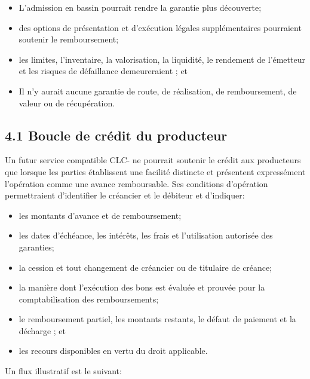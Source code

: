 \documentclass[11pt]{article}
\begin{document}
\begin{itemize}[leftmargin=*]
\item L'admission en bassin pourrait rendre la garantie plus découverte;
\item des options de présentation et d'exécution légales supplémentaires pourraient soutenir le remboursement;
\item les limites, l'inventaire, la valorisation, la liquidité, le rendement de l'émetteur et les risques de défaillance demeureraient ; et
\item Il n'y aurait aucune garantie de route, de réalisation, de remboursement, de valeur ou de récupération.
\end{itemize}
\subsection*{4.1 Boucle de crédit du producteur}

Un futur service compatible CLC- ne pourrait soutenir le crédit aux producteurs que lorsque les parties établissent une facilité distincte et présentent expressément l'opération comme une avance remboursable. Ses conditions d'opération permettraient d'identifier le créancier et le débiteur et d'indiquer:

\begin{itemize}[leftmargin=*]
\item les montants d'avance et de remboursement;
\item les dates d'échéance, les intérêts, les frais et l'utilisation autorisée des garanties;
\item la cession et tout changement de créancier ou de titulaire de créance;
\item la manière dont l'exécution des bons est évaluée et prouvée pour la comptabilisation des remboursements;
\item le remboursement partiel, les montants restants, le défaut de paiement et la décharge ; et
\item les recours disponibles en vertu du droit applicable.
\end{itemize}
Un flux illustratif est le suivant:
\end{document}
